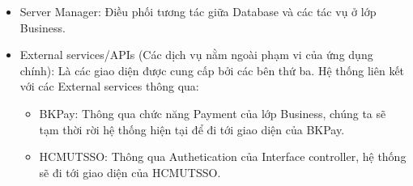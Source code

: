 \begin{itemize}
\begin{itemize}
\end{itemize}

\item Server Manager: Điều phối tương tác giữa Database và các tác vụ ở lớp Business.\par
\item External services/APIs (Các dịch vụ nằm ngoài phạm vi của ứng dụng chính): Là các giao diện được cung cấp bởi các bên thứ ba. Hệ thống liên kết với các External services thông qua:\par    
\begin{itemize}
\item BK\textunderscore Pay: Thông qua chức năng Payment của lớp Business, chúng ta sẽ tạm thời rời hệ thống hiện tại để đi tới giao diện của BK\textunderscore Pay. 
\item HCMUT\textunderscore SSO: Thông qua Authetication của Interface controller, hệ thống sẽ đi tới giao diện của HCMUT\textunderscore SSO. \par

\end{itemize}


\end{itemize}


